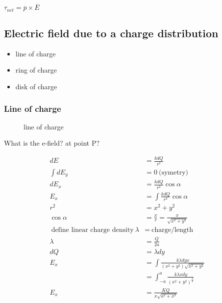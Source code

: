 $\tau _{net} = \overline{p} \times  \overline{E}$

\subsection{Electric field due to a charge distribution}%
\label{sub:electric_field_due_to_a_charge_distribution}

\begin{itemize}
	\item line of charge
	\item ring of charge
	\item disk of charge
\end{itemize}

\subsubsection{Line of charge}%
\label{ssub:line_of_charge}

\begin{figure}[ht]
	\centering
	\caption{line of charge}
	\label{fig:line-of-charge}
\end{figure}

\begin{example}[3]
	What is the e-field? at point P?
\end{example}

\begin{solution}[3]
	\begin{align*}
		dE &=  \frac{k d Q}{r^2} \\
		\int dE_{y} &= 0 \:\text{(symetry)}\: \\
		dE_{x} &=  \frac{kdQ}{r^2} \cos \alpha \\
		E_{x} &=  \int \frac{kdQ}{r^2} \cos \alpha \\
		r^2 &=  x^2 + y^2 \\
		\cos \alpha &= \frac{x}{r}  = \frac{x}{\sqrt{x^2 + y^2} }\\
		\:\text{define linear charge density}\: \lambda &= \:\text{charge/length}\: \\
		\lambda &= \frac{Q}{2a} \\
		dQ &= \lambda dy \\
		E_{x} &= \int \frac{k \lambda dy x}{(x^2+y^2)\sqrt{x^2+y^2} } \\
			  &= \int_{-a}^{a}   \frac{k \lambda  x dy}{(x^2 + y^2)^{\frac{3}{2}}} \\
		E_{x}&= \boxed{\frac{KQ}{x \sqrt{a^2+x^2} }} \\
	\end{align*}

\end{solution}

